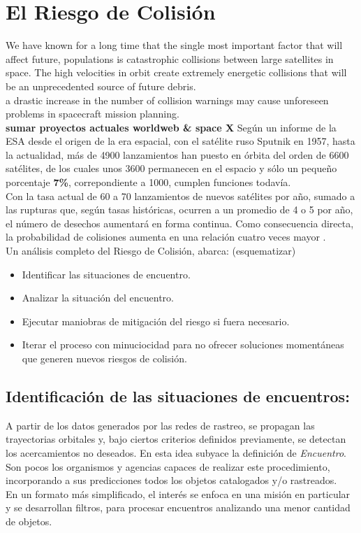\section{El Riesgo de Colisi\'on}
We have known for a long time that the single most important factor that will affect future, 
populations is catastrophic collisions between large satellites in space.  The high velocities in orbit create extremely energetic collisions that will be an unprecedented source of future debris.\\
 a drastic increase in the number of collision warnings may cause unforeseen problems in spacecraft mission planning.\\
{\bf{sumar proyectos actuales worldweb \& space X}}
Seg\'un un informe de la \ac{ESA} desde el origen de la era espacial, con el sat\'elite ruso Sputnik en 1957, hasta la actualidad, m\'as de 4900 lanzamientos han puesto en \'orbita del orden de 6600 sat\'elites, de los cuales unos 3600 permanecen en el espacio y s\'olo un peque\~no porcentaje {\bf{7\%}}, correpondiente a 1000, cumplen funciones todav\'ia.\\
Con la tasa actual de 60 a 70 lanzamientos de nuevos sat\'elites por a\~no, sumado a las rupturas que, seg\'un tasas hist\'oricas, ocurren a un promedio de 4 o 5 por a\~no, el n\'umero de desechos aumentar\'a en forma continua. Como consecuencia directa, la probabilidad de colisiones aumenta en una relaci\'on cuatro veces mayor \cite{esaSD}.\\

Un an\'alisis completo del Riesgo de Colisi\'on, abarca: (esquematizar)

\begin{itemize}
\item Identificar las situaciones de encuentro.
\item Analizar la situaci\'on del encuentro.
\item Ejecutar maniobras de mitigaci\'on del riesgo si fuera necesario.
\item Iterar el proceso con minuciocidad para no ofrecer soluciones moment\'aneas que generen nuevos riesgos de colisi\'on.
\end{itemize}

\subsection*{Identificaci\'on de las situaciones de encuentros:}
A partir de los datos generados por las redes de rastreo, se propagan las trayectorias orbitales y, bajo ciertos criterios definidos previamente, se detectan los acercamientos no deseados. En esta idea subyace la definici\'on de {\it{Encuentro}}.\\
Son pocos los organismos y agencias capaces de realizar este procedimiento, incorporando a sus predicciones todos los objetos catalogados y/o rastreados.\\
En un formato m\'as simplificado, el inter\'es se enfoca en una misi\'on en particular y se desarrollan filtros, para procesar encuentros analizando una menor cantidad de objetos.\\


